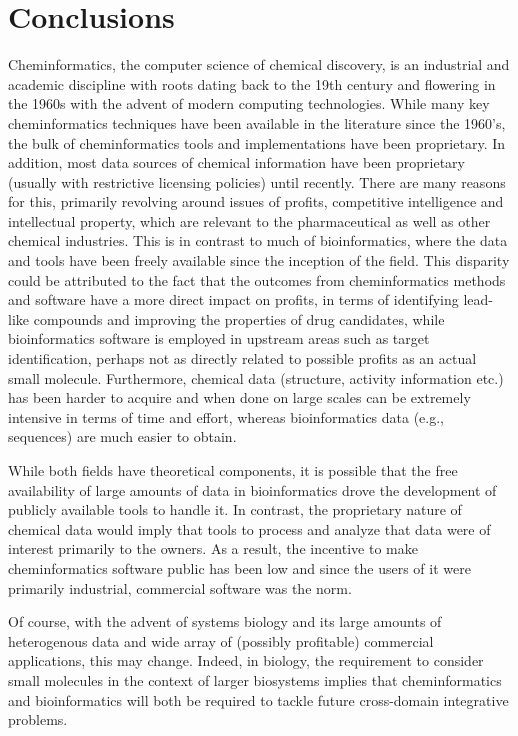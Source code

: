 \documentclass{sig-alternate}
\begin{document}
%
\section{Conclusions}
\label{sec:conclusions}
Cheminformatics, the computer science of chemical discovery, is an
industrial and academic discipline with roots dating back to the 19th
century and flowering in the 1960s with the advent of modern computing
technologies. While many key cheminformatics techniques have been
available in the literature since the 1960's, the bulk of
cheminformatics tools and implementations have been proprietary. In
addition, most data sources of chemical information have been
proprietary (usually with restrictive licensing policies) until
recently. There are many reasons for this, primarily revolving around
issues of profits, competitive intelligence and intellectual property,
which are relevant to the pharmaceutical as well as other chemical
industries. This is in contrast to much of bioinformatics, where the
data and tools have been freely available since the inception of the
field. This disparity could be attributed to the fact that the
outcomes from cheminformatics methods and software have a more direct
impact on profits, in terms of identifying lead-like compounds and
improving the properties of drug candidates, while bioinformatics
software is employed in upstream areas such as target identification,
perhaps not as directly related to possible profits as an actual small
molecule. Furthermore, chemical data (structure, activity information
etc.) has been harder to acquire and when done on large scales can be
extremely intensive in terms of time and effort, whereas
bioinformatics data (e.g., sequences) are much easier to obtain.

While both fields have theoretical components, it is possible that the
free availability of large amounts of data in bioinformatics drove the
development of publicly available tools to handle it. In contrast, the
proprietary nature of chemical data would imply that tools to process
and analyze that data were of interest primarily to the owners. As a
result, the incentive to make cheminformatics software public has been
low and since the users of it were primarily industrial, commercial
software was the norm.

Of course, with the advent of systems biology and its large amounts of
heterogenous data and wide array of (possibly profitable) commercial
applications, this may change. Indeed, in biology, the
requirement to consider small molecules in the context of larger
biosystems implies that cheminformatics and bioinformatics will both
be required to tackle future cross-domain integrative problems.
\end{document}
